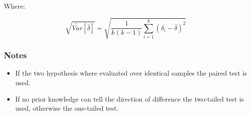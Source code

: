 		Where:

		$$\sqrt{\tilde{Var}[\bar{\delta}]} = \sqrt{\frac{1}{k(k-1)}\sum\limits_{i=1}^k(\delta_i-\bar{\delta})^2}$$

		\subsubsection{Notes}

		\begin{multicols}{2}
			\begin{itemize}
				\item If the two hypothesis where evaluated over identical samples the paired test is used.
				\item If no prior knowledge can tell the direction of difference the two-tailed test is used, otherwise the one-tailed test.
			\end{itemize}
		\end{multicols}

